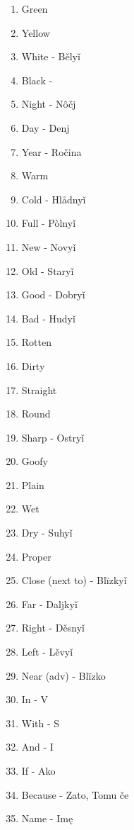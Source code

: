 \begin{multicols}{2}
\begin{enumerate}
	\item Green
	\item Yellow
	\item White - Bělyǐ
	\item Black - 
	\item Night - Nôčj
	\item Day - Denj
	\item Year - Ročina
	\item Warm
	\item Cold - Hlådnyǐ
	\item Full - Pòlnyǐ
	\item New - Novyǐ
	\item Old - Staryǐ
	\item Good - Dobryǐ 
	\item Bad - Hudyǐ
	\item Rotten
	\item Dirty
	\item Straight
	\item Round
	\item Sharp - Ostryǐ
	\item Goofy
	\item Plain
	\item Wet
	\item Dry - Suhyǐ
	\item Proper
	\item Close (next to) - Blïzkyǐ
	\item Far - Daljkyǐ
	\item Right - Děsnyǐ
	\item Left - Lěvyǐ
	\item Near (adv) - Blïzko
	\item In - V
	\item With - S
	\item And - I
	\item If - Ako
	\item Because - Zato, Tomu če
	\item Name - Imę
\end{enumerate}
\end{multicols}